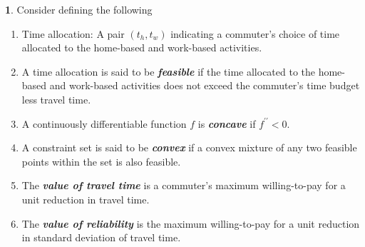 \documentclass[12pt,a4paper,british]{article}
\theoremstyle{definition}
\newtheorem{defn}{\protect\definitionname}
\theoremstyle{plain}
\theoremstyle{plain}
\providecommand{\definitionname}{Definition}
\begin{document}
\clearpage{}
\begin{defn}
Consider defining the following
\end{defn}
\begin{enumerate}
\item Time allocation: A pair $\left(t_{h},t_{w}\right)$ indicating a commuter's
choice of time allocated to the home-based and work-based activities.
\item A time allocation is said to be \textbf{\textit{feasible}} if the
time allocated to the home-based and work-based activities does not
exceed the commuter's time budget less travel time.
\item A continuously differentiable function $f$ is \textbf{\textit{concave}}
if $f^{\prime\prime}<0$.
\item A constraint set is said to be \textbf{\textit{convex}} if a convex
mixture of any two feasible points within the set is also feasible.
\item The \textbf{\textit{value of travel time}} is a commuter's maximum
willing-to-pay for a unit reduction in travel time.
\item The \textbf{\textit{value of reliability}} is the maximum willing-to-pay
for a unit reduction in standard deviation of travel time.
\end{enumerate}
\end{document}
